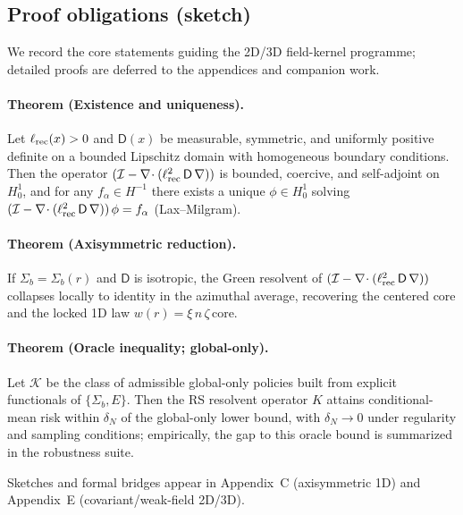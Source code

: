 \documentclass[fleqn,usenatbib]{mnras}
\begin{document}
\subsection{Proof obligations (sketch)}
\noindent We record the core statements guiding the 2D/3D field-kernel programme; detailed proofs are deferred to the appendices and companion work.

\paragraph{Theorem (Existence and uniqueness).} Let $\ell_{\rm rec}(x)>0$ and $\mathsf D(x)$ be measurable, symmetric, and uniformly positive definite on a bounded Lipschitz domain with homogeneous boundary conditions. Then the operator $(\mathcal I-\nabla\!\cdot(\ell_{\rm rec}^2\,\mathsf D\,\nabla))$ is bounded, coercive, and self-adjoint on $H^1_0$, and for any $f_\alpha\in H^{-1}$ there exists a unique $\phi\in H^1_0$ solving $(\mathcal I-\nabla\!\cdot(\ell_{\rm rec}^2\,\mathsf D\,\nabla))\,\phi=f_\alpha$ (Lax–Milgram).

\paragraph{Theorem (Axisymmetric reduction).} If $\Sigma_b=\Sigma_b(r)$ and $\mathsf D$ is isotropic, the Green resolvent of $(\mathcal I-\nabla\!\cdot(\ell_{\rm rec}^2\,\mathsf D\,\nabla))$ collapses locally to identity in the azimuthal average, recovering the centered core and the locked 1D law $w(r)=\xi\,n\,\zeta\,\mathrm{core}$.

\paragraph{Theorem (Oracle inequality; global-only).} Let $\mathcal K$ be the class of admissible global-only policies built from explicit functionals of $\{\Sigma_b,E\}$. Then the RS resolvent operator $K$ attains conditional-mean risk within $\delta_N$ of the global-only lower bound, with $\delta_N\to 0$ under regularity and sampling conditions; empirically, the gap to this oracle bound is summarized in the robustness suite.

\noindent Sketches and formal bridges appear in Appendix~C (axisymmetric 1D) and Appendix~E (covariant/weak-field 2D/3D).
\end{document}
